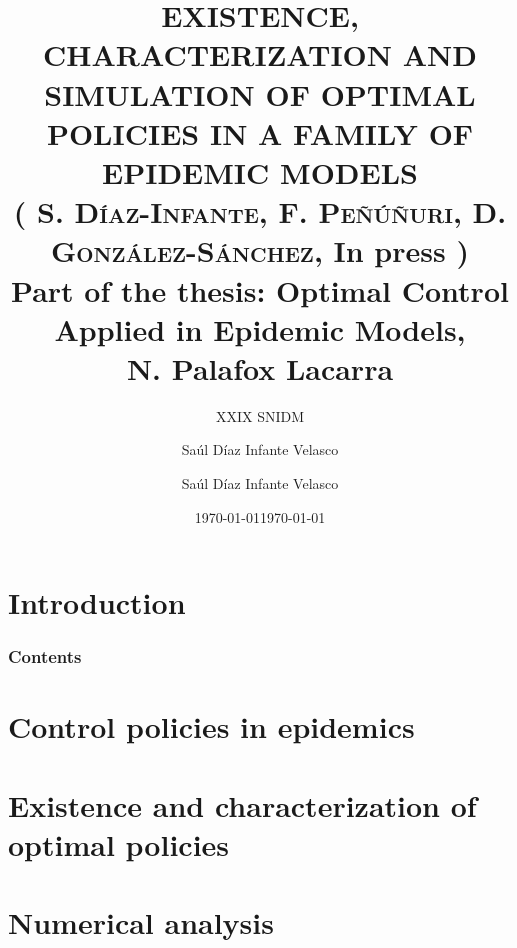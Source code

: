 \documentclass[10pt]{beamer}
\title{
    EXISTENCE, CHARACTERIZATION AND SIMULATION OF OPTIMAL
    POLICIES IN A FAMILY OF EPIDEMIC MODELS
    \\
        \small{
            (%
                \textsc{%
                    S. D\'iaz-Infante, %
                    F. Pe\~n\'u\~nuri, %
                    D. Gonz\'alez-S\'anchez}, In press%
            )\\%
        Part of the thesis:
        Optimal Control Applied in Epidemic Models,
        \\
        N. Palafox Lacarra
        \\
        }{}
}
\subtitle{XXIX SNIDM}
\date{\today}
\author{Sa\'ul D\'iaz Infante Velasco}
\institute{CONACYT-Universidad de Sonora}
\author[Sa\'ul D\'iaz Infante Velasco]{
        Sa\'ul D\'iaz Infante Velasco
    }
\date[\ccbyncsa]{\today }
\begin{document}
    \begin{frame}[plain]
        \maketitle
    \end{frame}
    \section{Introduction}
        
        \begin{frame}
            \frametitle{Contents}
            \tableofcontents
        \end{frame}
    \section{Control policies in epidemics}
        
        
    \section{Existence and characterization of optimal policies}
        
        
    \section{Numerical analysis}
\end{document}
